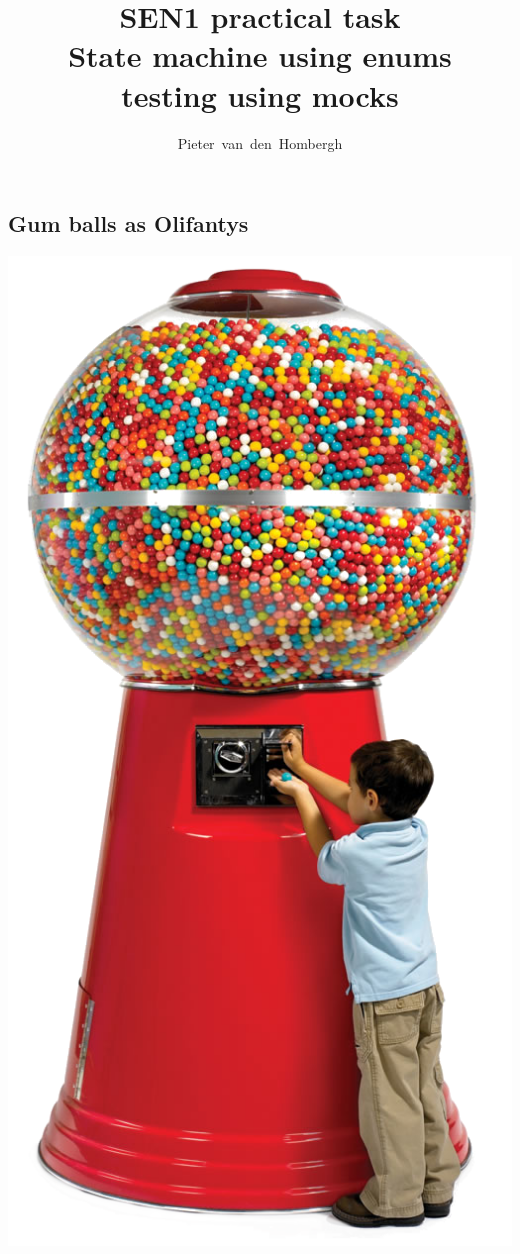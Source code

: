 
\author{Pieter~van~den~Hombergh}
\title{SEN1 practical task\\State machine using enums\\
  testing using mocks}

\begin{multicols}{2}
  \maketitle
  \section*{Gum balls as Olifantys}
  \begin{center}
    \begin{Figure}
    \includegraphics[width=.9\linewidth]{figures/gumballmachine}
  \end{Figure}
\end{center}


\end{multicols}
